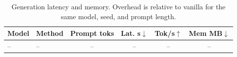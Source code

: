 \begin{table}[t]
\centering
\caption{Generation latency and memory. Overhead is relative to vanilla for the same model, seed, and prompt length.}
\label{tab:efficiency}
\small
\begin{tabular}{llcccc}
\toprule
Model & Method & Prompt toks & Lat. s$\downarrow$ & Tok/s$\uparrow$ & Mem MB$\downarrow$ \\
\midrule
-- & -- & -- & -- & -- & -- \\
\bottomrule
\end{tabular}
\end{table}
